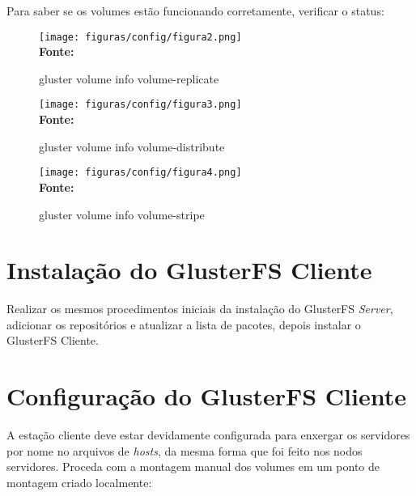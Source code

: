 {Para saber se os  volumes estão funcionando corretamente, verificar o status:

 
\begin{figure}[!htp]
\centering
\caption{gluster volume info volume-replicate}
\vspace{-0.3cm}
\texttt{[image: figuras/config/figura2.png]}
\footnotesize\\ \textbf{Fonte: }
\label{fig:replicate}
\end{figure}


 \begin{figure}[!htp]
\centering
\caption{gluster volume info volume-distribute}
\vspace{-0.3cm}
\texttt{[image: figuras/config/figura3.png]}
\footnotesize\\ \textbf{Fonte: }
\label{fig:distribute}
\end{figure}

 \begin{figure}[!htp]
\centering
\caption{gluster volume info volume-stripe}
\vspace{-0.3cm}
\texttt{[image: figuras/config/figura4.png]}
\footnotesize\\ \textbf{Fonte: }
\label{fig:stripe}
\end{figure}

\section*{Instalação do GlusterFS Cliente}

Realizar os mesmos procedimentos iniciais da instalação do GlusterFS \textit{Server}, 
adicionar os repositórios e atualizar a lista de pacotes, depois instalar o GlusterFS Cliente.


\section*{Configuração do GlusterFS Cliente}

A estação cliente deve estar devidamente configurada para enxergar os servidores por nome no arquivos de \textit{hosts}, 
da mesma forma que foi feito nos nodos servidores. Proceda com a montagem manual dos volumes em um ponto de montagem criado localmente:

}
